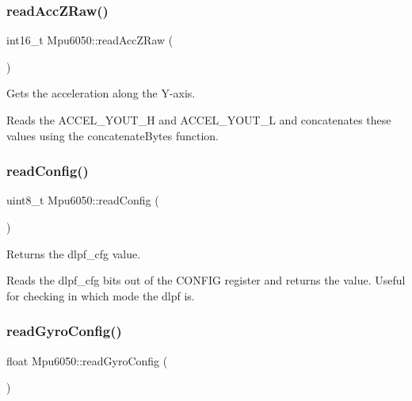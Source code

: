 \subsubsection{\texorpdfstring{read\+Acc\+Z\+Raw()}{readAccZRaw()}}
{\footnotesize\ttfamily int16\+\_\+t Mpu6050\+::read\+Acc\+Z\+Raw (\begin{DoxyParamCaption}{ }\end{DoxyParamCaption})\hspace{0.3cm}{\ttfamily [virtual]}}



Gets the acceleration along the Y-\/axis. 

Reads the A\+C\+C\+E\+L\+\_\+\+Y\+O\+U\+T\+\_\+H and A\+C\+C\+E\+L\+\_\+\+Y\+O\+U\+T\+\_\+L and concatenates these values using the concatenate\+Bytes function. \mbox{\label{classMpu6050_acae18af6f85523362243bb61cf865586}} 
\subsubsection{\texorpdfstring{read\+Config()}{readConfig()}}
{\footnotesize\ttfamily uint8\+\_\+t Mpu6050\+::read\+Config (\begin{DoxyParamCaption}{ }\end{DoxyParamCaption})\hspace{0.3cm}{\ttfamily [virtual]}}



Returns the dlpf\+\_\+cfg value. 

Reads the dlpf\+\_\+cfg bits out of the C\+O\+N\+F\+IG register and returns the value. Useful for checking in which mode the dlpf is. \mbox{\label{classMpu6050_a1a6e1a3452ee6d6d667c5ae425326772}} 
\subsubsection{\texorpdfstring{read\+Gyro\+Config()}{readGyroConfig()}}
{\footnotesize\ttfamily float Mpu6050\+::read\+Gyro\+Config (\begin{DoxyParamCaption}{ }\end{DoxyParamCaption})\hspace{0.3cm}{\ttfamily [virtual]}}



